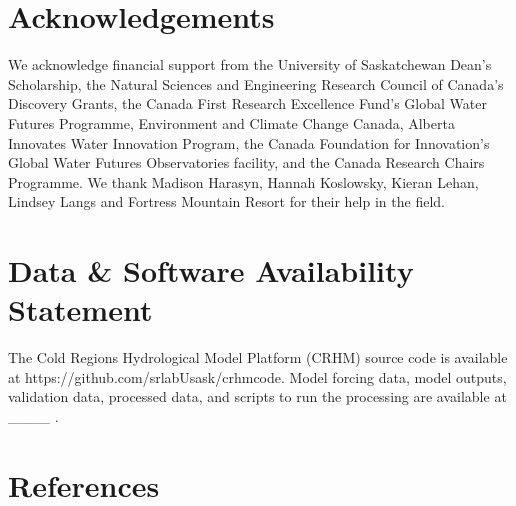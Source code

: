 \documentclass[
]{agujournal2019}
\begin{document}
\section{Acknowledgements}\label{acknowledgements}

We acknowledge financial support from the University of Saskatchewan
Dean's Scholarship, the Natural Sciences and Engineering Research
Council of Canada's Discovery Grants, the Canada First Research
Excellence Fund's Global Water Futures Programme, Environment and
Climate Change Canada, Alberta Innovates Water Innovation Program, the
Canada Foundation for Innovation's Global Water Futures Observatories
facility, and the Canada Research Chairs Programme. We thank Madison
Harasyn, Hannah Koslowsky, Kieran Lehan, Lindsey Langs and Fortress
Mountain Resort for their help in the field.

\section{Data \& Software Availability
Statement}\label{data-software-availability-statement}

The Cold Regions Hydrological Model Platform (CRHM) source code is
available at https://github.com/srlabUsask/crhmcode. Model forcing data,
model outputs, validation data, processed data, and scripts to run the
processing are available at \_\_\_\_ .

\pagebreak

\section*{References}\label{references}
\end{document}

